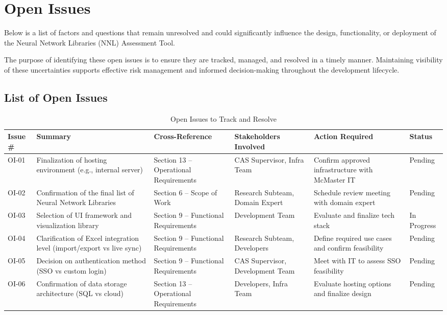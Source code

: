 \documentclass[12pt]{article}
\begin{document}
\section{Open Issues}

Below is a list of factors and questions that remain unresolved and could significantly influence the design, functionality, or deployment of the Neural Network Libraries (NNL) Assessment Tool.

The purpose of identifying these open issues is to ensure they are tracked, managed, and resolved in a timely manner. Maintaining visibility of these uncertainties supports effective risk management and informed decision-making throughout the development lifecycle.

\subsection{List of Open Issues}

\begin{table}[H]
\caption{Open Issues to Track and Resolve}
\centering
\begin{tabularx}{\textwidth}{|p{1.2cm}|p{3cm}|p{3cm}|p{3cm}|p{3cm}|p{2cm}|}
\hline
\textbf{Issue \#} & \textbf{Summary} & \textbf{Cross-Reference} & \textbf{Stakeholders Involved} & \textbf{Action Required} & \textbf{Status} \\ \hline
OI-01 & Finalization of hosting environment (e.g., internal server) & Section 13 – Operational Requirements & CAS Supervisor, Infra Team & Confirm approved infrastructure with McMaster IT & Pending \\ \hline
OI-02 & Confirmation of the final list of Neural Network Libraries & Section 6 – Scope of Work & Research Subteam, Domain Expert & Schedule review meeting with domain expert & Pending \\ \hline
OI-03 & Selection of UI framework and visualization library & Section 9 – Functional Requirements & Development Team & Evaluate and finalize tech stack & In Progress \\ \hline
OI-04 & Clarification of Excel integration level (import/export vs live sync) & Section 9 – Functional Requirements & Research Subteam, Developers & Define required use cases and confirm feasibility & Pending \\ \hline
OI-05 & Decision on authentication method (SSO vs custom login) & Section 9 – Functional Requirements & CAS Supervisor, Development Team & Meet with IT to assess SSO feasibility & Pending \\ \hline
OI-06 & Confirmation of data storage architecture (SQL vs cloud) & Section 13 – Operational Requirements & Developers, Infra Team & Evaluate hosting options and finalize design & Pending \\ \hline
\end{tabularx}
\end{table}
\end{document}
